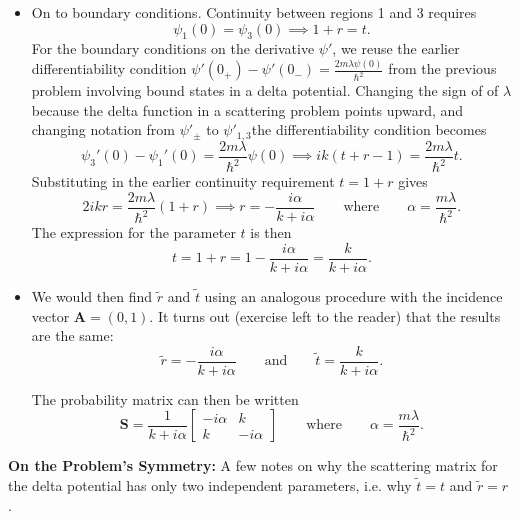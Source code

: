 \documentclass[11pt, a4paper]{article}
\newcommand{\eqtext}[1]{\qquad \text{#1} \qquad}
\renewcommand{\vec}[1]{\bm{#1}} %
\newcommand{\mat}[1]{\mathbf{#1}} %
\begin{document}
\begin{itemize}
	\item On to boundary conditions. Continuity between regions 1 and 3 requires
	\begin{equation*}
		\psi_{1}(0) = \psi_{3}(0) \implies 1 + r = t.
	\end{equation*} 
	For the boundary conditions on the derivative $ \psi' $, we reuse the earlier differentiability condition $ \psi'(0_{+}) - \psi'(0_{-}) = \frac{2m\lambda\psi(0)}{\hbar^{2}} $ from the previous problem involving bound states in a delta potential. Changing the sign of of $ \lambda $ because the delta function in a scattering problem points upward, and changing notation from $ \psi'_{\pm} $ to $ \psi'_{1,3} $the differentiability condition becomes
	\begin{equation*}
		\psi_{3}'(0) - \psi_{1}'(0) = \frac{2m\lambda}{\hbar^{2}} \psi(0) \implies ik(t + r -1) = \frac{2m\lambda}{\hbar^{2}} t.
	\end{equation*}
	Substituting in the earlier continuity requirement $ t = 1 + r $ gives
	\begin{equation*}
		2ikr = \frac{2m\lambda}{\hbar^{2}} (1 + r) \implies r = -\frac{i\alpha}{k + i\alpha} \eqtext{where} \alpha = \frac{m\lambda}{\hbar^{2}}.
	\end{equation*}
	The expression for the parameter $ t $ is then
	\begin{equation*}
		t = 1 + r = 1 - \frac{i\alpha}{k + i\alpha} = \frac{k}{k + i\alpha}.
	\end{equation*}
	
	\item We would then find $ \tilde{r} $ and $ \tilde{t} $ using an analogous procedure with the incidence vector $ \vec{A} = (0, 1) $. It turns out (exercise left to the reader) that the results are the same:
	\begin{equation*}
		\tilde{r} = -\frac{i\alpha}{k + i\alpha}  \eqtext{and} \tilde{t} = \frac{k}{k + i\alpha}.
	\end{equation*}
	
	The probability matrix can then be written
	\begin{equation*}
		\mat{S} = \frac{1}{k + i \alpha} 
		\begin{bmatrix}
			- i \alpha & k\\
			k & - i \alpha
		\end{bmatrix} 
		\eqtext{where}
		\alpha = \frac{m\lambda}{\hbar^{2}}.
	\end{equation*}
\end{itemize}
\textbf{On the Problem's Symmetry:} A few notes on why the scattering matrix for the delta potential has only two independent parameters, i.e. why $ \tilde{t} = t $ and $ \tilde{r} = r $.
\end{document}
